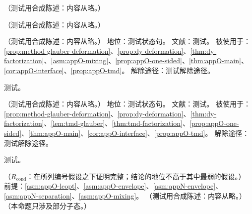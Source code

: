 \begin{definition}[测量相容的割图求和与弱等价]\label{def:appO-weak-equivalence}
（测试用合成陈述：内容从略。）
\end{definition}

\begin{definition}\label{def:appO-rewriting}
（测试用合成陈述：内容从略。）
\end{definition}

\begin{assumption}\label{asm:appO-envelope}
（测试用合成陈述：内容从略。）
地位：测试状态句。
文献：测试。
被使用于：\cref{prop:method-glauber-deformation}、\cref{prop:dy-deformation}、\cref{thm:dy-factorization}、\cref{asm:appO-mixing}、\cref{prop:appO-one-sided}、\cref{thm:appO-main}、\cref{cor:appO-interface}、\cref{prop:appO-tmd}。
解除途径：测试解除途径。
\end{assumption}
\begin{proofsketch}测试。\end{proofsketch}

\begin{assumption}\label{asm:appO-mixing}
（测试用合成陈述：内容从略。）
地位：测试状态句。
文献：测试。
被使用于：\cref{prop:method-glauber-deformation}、\cref{prop:dy-deformation}、\cref{thm:dy-factorization}、\cref{lem:tmd-glauber}、\cref{thm:tmd-factorization}、\cref{prop:appO-one-sided}、\cref{thm:appO-main}、\cref{cor:appO-interface}、\cref{prop:appO-tmd}。
解除途径：测试解除途径。
\end{assumption}
\begin{proofsketch}测试。\end{proofsketch}

\begin{proposition}\label{prop:appO-one-sided}
（$R_{\mathrm{cond}}$：在所列编号假设之下证明完整；结论的地位不高于其中最弱的假设。）
前提：\cref{asm:appO-lcopt}、\cref{asm:appO-envelope}、\cref{asm:appN-envelope}、\cref{asm:appN-separation}、\cref{asm:appO-mixing}。
（测试用合成陈述：内容从略。）
（本命题只涉及部分子态。）
\end{proposition}


